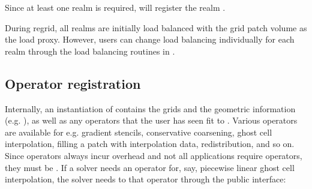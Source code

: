 \documentclass[letterpaper,10pt,english]{sphinxmanual}
\begin{document}
\begin{sphinxVerbatim}[commandchars=\\\{\},formatcom=\scriptsize]
 
\end{sphinxVerbatim}

Since at least one realm is required,  will  register the realm .

During regrid, all realms are initially load balanced with the grid patch volume as the load proxy.
However, users can change load balancing individually for each realm through the load balancing routines in {\hyperref[\detokenize{Source/TimeStepper:chap-timestepper}]{}}.


\subsection{Operator registration}
\label{\detokenize{Source/Realm:operator-registration}}
Internally, an instantiation of  contains the grids and the geometric information (e.g. ), as well as any operators that the user has seen fit to .
Various operators are available for e.g. gradient stencils, conservative coarsening, ghost cell interpolation, filling a patch with interpolation data, redistribution, and so on.
Since operators always incur overhead and not all applications require  operators, they must be .
If a solver needs an operator for, say, piecewise linear ghost cell interpolation, the solver needs to  that operator through the  public interface:

\begin{sphinxVerbatim}[commandchars=\\\{\},formatcom=\scriptsize]
    
\end{sphinxVerbatim}
\end{document}
